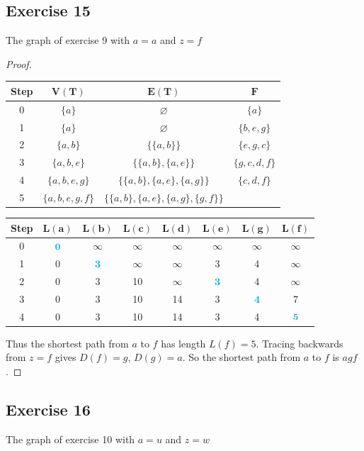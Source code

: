 \documentclass[14pt]{extarticle}
\newcommand{\es}{\varnothing}
\newcommand{\cy}{\color{cyan}}
\begin{document}
\subsection{Exercise 15}
The graph of exercise 9 with \(a = a\) and \(z = f\)
\begin{proof}
\begin{center}
\begin{tabular}{|c|c|c|c|}
\hline
{\bf \cy Step} & {\cy \(\bm{V(T)}\)} & {\cy \(\bm{E(T)}\)} & {\cy \(\bm{F}\)}  \\
\hline
0 & \(\{a\}\) & \(\es\) & \(\{a\}\) \\
1 & \(\{a\}\) & \(\es\) & \(\{b,e,g\}\) \\
2 & \(\{a,b\}\) & \(\{\{a,b\}\}\) & \(\{e,g,c\}\) \\
3 & \(\{a,b,e\}\) & \(\{\{a,b\}, \{a,e\}\}\) & \(\{g,c,d,f\}\) \\
4 & \(\{a,b,e,g\}\) & \(\{\{a,b\}, \{a,e\}, \{a,g\}\}\) & \(\{c,d,f\}\) \\
5 & \(\{a,b,e,g,f\}\) & \(\{\{a,b\}, \{a,e\}, \{a,g\}, \{g,f\}\}\) &  \\
\hline
\end{tabular}

\begin{tabular}{|c|c|c|c|c|c|c|c|}
\hline
{\bf \cy Step} & {\cy \(\bm{L(a)}\)} & {\cy\(\bm{L(b)}\)} & {\cy\(\bm{L(c)}\)} & {\cy\(\bm{L(d)}\)} & {\cy\(\bm{L(e)}\)} &  {\cy\(\bm{L(g)}\)} & {\cy\(\bm{L(f)}\)}\\
\hline
0 & \({\cy \bm{0}}\) & \(\infty\) & \(\infty\) & \(\infty\) & \(\infty\) & \(\infty\) & \(\infty\) \\
1 & 0 & \({\cy \bm{3}}\) & \(\infty\) & \(\infty\) & 3 & 4 & \(\infty\) \\
2 & 0 & 3 & 10 & \(\infty\) & \({\cy \bm{3}}\) & 4 & \(\infty\) \\
3 & 0 & 3 & 10 & 14 & 3 & \({\cy \bm{4}}\) & 7 \\
4 & 0 & 3 & 10 & 14 & 3 & 4 & \({\cy \bm{5}}\) \\
\hline
\end{tabular}
\end{center}

Thus the shortest path from \(a\) to \(f\) has length \(L(f) = 5\). Tracing backwards from \(z = f\) gives \(D(f) = g\), 
\(D(g) = a\). So the shortest path from \(a\) to \(f\) is \(agf\).
\end{proof}

\subsection{Exercise 16}
The graph of exercise 10 with \(a = u\) and \(z = w\)
\end{document}
